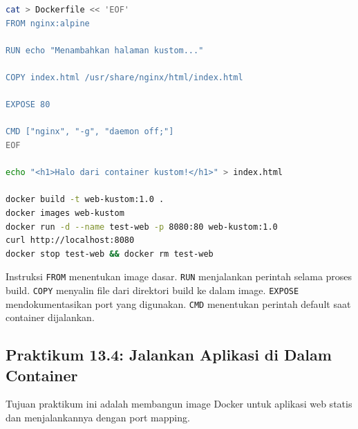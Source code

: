 \begin{lstlisting}[language=bash, caption={Contoh Dockerfile dan proses build}]
cat > Dockerfile << 'EOF'
FROM nginx:alpine

RUN echo "Menambahkan halaman kustom..."

COPY index.html /usr/share/nginx/html/index.html

EXPOSE 80

CMD ["nginx", "-g", "daemon off;"]
EOF

echo "<h1>Halo dari container kustom!</h1>" > index.html

docker build -t web-kustom:1.0 .
docker images web-kustom
docker run -d --name test-web -p 8080:80 web-kustom:1.0
curl http://localhost:8080
docker stop test-web && docker rm test-web
\end{lstlisting}

Instruksi \texttt{FROM} menentukan image dasar. \texttt{RUN} menjalankan
perintah selama proses build. \texttt{COPY} menyalin file dari direktori build
ke dalam image. \texttt{EXPOSE} mendokumentasikan port yang digunakan. \texttt{CMD}
menentukan perintah default saat container dijalankan.

\subsection*{Praktikum 13.4: Jalankan Aplikasi di Dalam Container}

Tujuan praktikum ini adalah membangun image Docker untuk aplikasi web statis
dan menjalankannya dengan port mapping.

